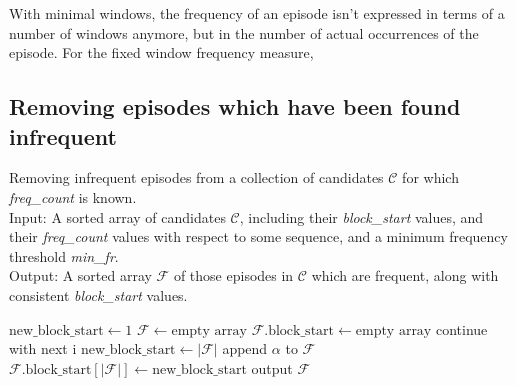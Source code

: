 With minimal windows, the frequency of an episode isn't expressed in terms of a number of windows anymore, but in the number of actual occurrences of the episode. For the fixed window frequency measure, %

\subsection{Removing episodes which have been found infrequent}
\label{sec:maintain-blocks}

\begin{algorithm}

\caption{Removing infrequent episodes from a collection of candidates $ \mathcal{C} $ for which \emph{freq\_count} is known. \\
Input: A sorted array of candidates $ \mathcal{C} $, including their \emph{block\_start} values, and their \emph{freq\_count} values with respect to some sequence, and a minimum frequency threshold \emph{min\_fr}. \\
Output: A sorted array $ \mathcal{F} $ of those episodes in $ \mathcal{C} $ which are frequent, along with consistent \emph{block\_start} values.
}

\begin{algorithmic}[1]

\State $ \text{new\_block\_start} \gets 1 $
\State $ \mathcal{F} \gets \text{empty array} $
\State $ \mathcal{F} \text{.block\_start} \gets \text{empty array} $
        \State continue with next i
    \EndIf
     \label{alglin:remove-infrequent-episodes:different-block-test}
        \State $ \text{new\_block\_start} \gets | \mathcal{F} | $
    \EndIf
    \State append $ \alpha $ to $ \mathcal{F} $
    \State $ \mathcal{F} \text{.block\_start}[ | \mathcal{F} | ] \gets \text{new\_block\_start} $
\EndFor
\State output $ \mathcal{F} $

\end{algorithmic}

\label{alg:remove-infrequent-episodes}
\end{algorithm}

